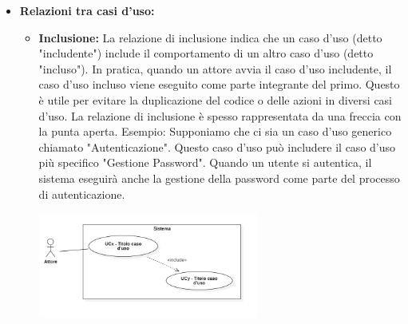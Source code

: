 \begin{itemize}
    \item \textbf{Relazioni tra casi d'uso:}
    \begin{itemize}
        \item \textbf{Inclusione:}
        La relazione di inclusione indica che un caso d'uso (detto "includente") include il comportamento di un altro caso d'uso (detto "incluso"). In pratica, quando un attore avvia il caso d'uso includente, il caso d'uso incluso viene eseguito come parte integrante del primo. Questo è utile per evitare la duplicazione del codice o delle azioni in diversi casi d'uso. La relazione di inclusione è spesso rappresentata da una freccia con la punta aperta.
        Esempio: Supponiamo che ci sia un caso d'uso generico chiamato "Autenticazione". Questo caso d'uso può includere il caso d'uso più specifico "Gestione Password". Quando un utente si autentica, il sistema eseguirà anche la gestione della password come parte del processo di autenticazione.
        \begin{minipage}[t]{\linewidth}
            \centering
            \includegraphics[width=0.6\textwidth]{../Images/NormeDiProgetto/Inclusione.PNG}
        \end{minipage}


\end{itemize}
\end{itemize}
